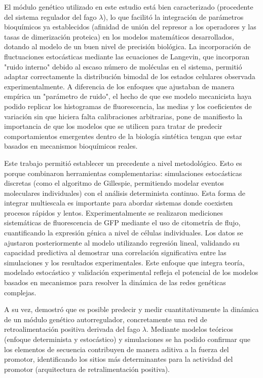 \documentclass[nochap]{config/ejercicios}
\begin{document}
El módulo genético utilizado en este estudio está bien caracterizado (procedente del sistema regulador del fago $\lambda$), lo que facilitó la integración de parámetros bioquímicos ya establecidos (afinidad de unión del represor a los operadores y las tasas de dimerización proteica) en los modelos matemáticos desarrollados, dotando al modelo de un buen nivel de precisión biológica. La incorporación de fluctuaciones estocásticas mediante las ecuaciones de Langevin, que incorporan "ruido interno" debido al escaso número de moléculas en el sistema, permitió adaptar correctamente la distribución bimodal de los estados celulares observada experimentalmente. A diferencia de los enfoques que ajustaban de manera empírica un "parámetro de ruido", el hecho de que ese modelo mecanicista haya podido replicar los histogramas de fluorescencia, las medias y los coeficientes de variación sin que hiciera falta calibraciones arbitrarias, pone de manifiesto la importancia de que los modelos que se utilicen para tratar de predecir comportamientos emergentes dentro de la biología sintética tengan que estar basados en mecanismos bioquímicos reales.

Este trabajo permitió establecer un precedente a nivel metodológico. Esto es porque combinaron herramientas complementarias: simulaciones estocásticas discretas (como el algoritmo de Gillespie, permitiendo modelar eventos moleculares individuales) con el análisis determinista continuo. Esta forma de integrar multiescala es importante para abordar sistemas donde coexisten procesos rápidos y lentos. Experimentalmente se realizaron mediciones sistemáticas de fluorescencia de GFP mediante el uso de citometría de flujo, cuantificando la expresión génica a nivel de células individuales. Los datos se ajustaron posteriormente al modelo utilizando regresión lineal, validando su capacidad predictiva al demostrar una correlación significativa entre las simulaciones y los resultados experimentales. Este enfoque que integra teoría, modelado estocástico y validación experimental refleja el potencial de los modelos basados en mecanismos para resolver la dinámica de las redes genéticas complejas.



A su vez, demostró que es posible predecir y medir cuantitativamente la dinámica de un módulo genético autorregulador, concretamente una red de retroalimentación positiva derivada del fago $\lambda$. Mediante modelos teóricos (enfoque determinista y estocástico) y simulaciones se ha podido confirmar que los elementos de secuencia contribuyen de manera aditiva a la fuerza del promotor, identificando los sitios más determinantes para la actividad del promotor (arquitectura de retralimentación positiva).
\end{document}

